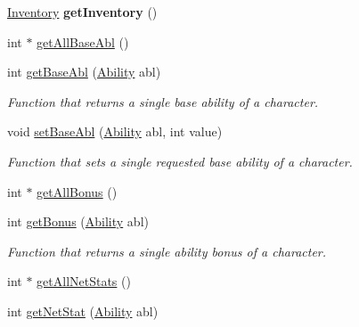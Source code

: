 \begin{DoxyCompactItemize}
\hypertarget{class_game_character_a65326d8f34ef36911b58b1654dce357b}{}\label{class_game_character_a65326d8f34ef36911b58b1654dce357b} 
\hyperlink{class_inventory}{Inventory} {\bfseries get\+Inventory} ()
\item 
int $\ast$ \hyperlink{class_game_character_a9b1de762235904d9f11147780ffb45f1}{get\+All\+Base\+Abl} ()
\item 
\hypertarget{class_game_character_ac7dd71d84cef1fa1cc31787c2a2f02aa}{}\label{class_game_character_ac7dd71d84cef1fa1cc31787c2a2f02aa} 
int \hyperlink{class_game_character_ac7dd71d84cef1fa1cc31787c2a2f02aa}{get\+Base\+Abl} (\hyperlink{class_ability}{Ability} abl)
\begin{DoxyCompactList}\small\item\em Function that returns a single base ability of a character. \end{DoxyCompactList}\item 
\hypertarget{class_game_character_af604f6f1df72988de0b3f34625844545}{}\label{class_game_character_af604f6f1df72988de0b3f34625844545} 
void \hyperlink{class_game_character_af604f6f1df72988de0b3f34625844545}{set\+Base\+Abl} (\hyperlink{class_ability}{Ability} abl, int value)
\begin{DoxyCompactList}\small\item\em Function that sets a single requested base ability of a character. \end{DoxyCompactList}\item 
int $\ast$ \hyperlink{class_game_character_a369f58b909a9ac72e572cd5c65773779}{get\+All\+Bonus} ()
\item 
\hypertarget{class_game_character_ab7f1c82a0451f417dad7651c55d96880}{}\label{class_game_character_ab7f1c82a0451f417dad7651c55d96880} 
int \hyperlink{class_game_character_ab7f1c82a0451f417dad7651c55d96880}{get\+Bonus} (\hyperlink{class_ability}{Ability} abl)
\begin{DoxyCompactList}\small\item\em Function that returns a single ability bonus of a character. \end{DoxyCompactList}\item 
int $\ast$ \hyperlink{class_game_character_ab70746cb0cd382cbe56c0190a03a3024}{get\+All\+Net\+Stats} ()
\item 
int \hyperlink{class_game_character_a94e6371f4f2f14c6a9e6aa9c8e78775b}{get\+Net\+Stat} (\hyperlink{class_ability}{Ability} abl)
\item 
\hypertarget{class_game_character_abbe3c5c7e6de419f6e14aaa74b91c60d}{}\label{class_game_character_abbe3c5c7e6de419f6e14aaa74b91c60d} 

\end{DoxyCompactItemize}

